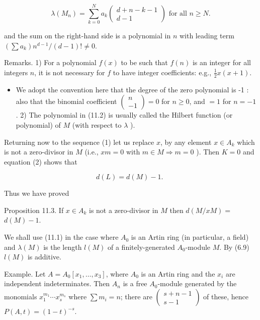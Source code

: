 \documentclass{standalone}
\theoremstyle{definition}
\theoremstyle{remark}
\begin{document}
\[
\lambda\left(M_{n}\right)=\sum_{k=0}^{N} a_{k}\left(\begin{array}{c}
d+n-k-1 \\
d-1
\end{array}\right) \text { for all } n \geqslant N .
\]

and the sum on the right-hand side is a polynomial in $n$ with leading term $\left(\sum a_{k}\right) n^{d-1} /(d-1) ! \neq 0$.

Remarks. 1) For a polynomial $f(x)$ to be such that $f(n)$ is an integer for all integers $n$, it is not necessary for $f$ to have integer coefficients: e.g., $\frac{1}{2} x(x+1)$.

\begin{itemize}
  \item We adopt the convention here that the degree of the zero polynomial is -1 : also that the binomial coefficient $\left(\begin{array}{c}n \\ -1\end{array}\right)=0$ for $n \geq 0$, and $=1$ for $n=-1$. 2) The polynomial in (11.2) is usually called the Hilbert function (or polynomial) of $M$ (with respect to $\lambda$ ).
\end{itemize}

Returning now to the sequence (1) let us replace $x$, by any element $x \in A_{k}$ which is not a zero-divisor in $M$ (i.e., $x m=0$ with $m \in M \Rightarrow m=0$ ). Then $K=0$ and equation (2) shows that

\[
d(L)=d(M)-1 \text {. }
\]

Thus we have proved

Proposition 11.3. If $x \in A_{k}$ is not a zero-divisor in $M$ then $d(M / x M)=$ $d(M)-1$.

We shall use (11.1) in the case where $A_{0}$ is an Artin ring (in particular, a field) and $\lambda(M)$ is the length $l(M)$ of a finitely-generated $A_{0}$-module $M$. By (6.9) $l(M)$ is additive.

Example. Let $A=A_{0}\left[x_{1}, \ldots, x_{3}\right]$, where $A_{0}$ is an Artin ring and the $x_{i}$ are independent indeterminates. Then $A_{n}$ is a free $A_{0}$-module generated by the monomials $x_{1}^{m_{1}} \cdots x_{s}^{m_{s}}$ where $\sum m_{i}=n$; there are $\left(\begin{array}{c}s+n-1 \\ s-1\end{array}\right)$ of these, hence $P(A, t)=(1-t)^{-s}$.
\end{document}
